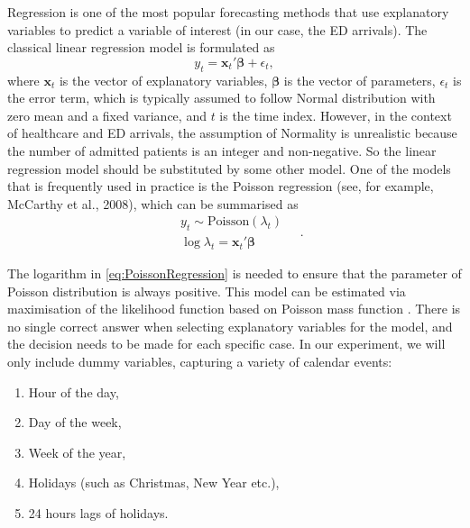 \documentclass[]{elsarticle} %
\providecommand{\tightlist}{%
  \setlength{\itemsep}{0pt}\setlength{\parskip}{0pt}}
\begin{document}
Regression is one of the most popular forecasting methods that use
explanatory variables to predict a variable of interest (in our case,
the ED arrivals). The classical linear regression model is formulated as
\begin{equation}
  {y}_t = \mathbf{x}_t' \boldsymbol{\beta} + \epsilon_t ,
\label{eq:linearRegression}
\end{equation} where \(\mathbf{x}_t\) is the vector of explanatory
variables, \(\boldsymbol{\beta}\) is the vector of parameters,
\(\epsilon_t\) is the error term, which is typically assumed to follow
Normal distribution with zero mean and a fixed variance, and \(t\) is the
time index. However, in the context of healthcare and ED arrivals, the
assumption of Normality is unrealistic because the number of admitted
patients is an integer and non-negative. So the linear regression model
should be substituted by some other model. One of the models that is
frequently used in practice is the Poisson regression (see, for example, McCarthy et al., 2008), which can be summarised as \begin{equation}
  \begin{aligned}
    & {y}_t \sim \mathrm{Poisson} \left( \lambda_t \right) \\
    & \log \lambda_t = \mathbf{x}_t' \boldsymbol{\beta}
  \end{aligned} \quad .
\label{eq:PoissonRegression}
\end{equation}

The logarithm in \eqref{eq:PoissonRegression} is needed to ensure that
the parameter of Poisson distribution is always positive. This model can
be estimated via maximisation of the likelihood function based on
Poisson mass function . There is no single
correct answer when selecting explanatory variables for the model, and
the decision needs to be made for each specific case. In our experiment,
we will only include dummy variables, capturing a variety of calendar
events:

\begin{enumerate}
\def\labelenumi{\arabic{enumi}.}
\tightlist
\item
  Hour of the day,
\item
  Day of the week,
\item
  Week of the year,
\item
  Holidays (such as Christmas, New Year etc.),
\item
  24 hours lags of holidays.
\end{enumerate}
\end{document}
